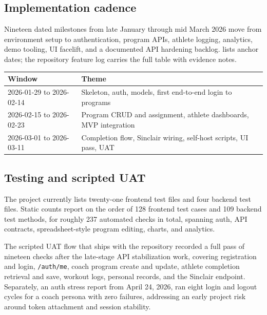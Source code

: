 \documentclass[
  letterpaper,
  DIV=11,
  numbers=noendperiod]{scrartcl}
\begin{document}
\subsection{Implementation cadence}\label{implementation-cadence}

Nineteen dated milestones from late January through mid March 2026 move
from environment setup to authentication, program APIs, athlete logging,
analytics, demo tooling, UI facelift, and a documented API hardening
backlog.  lists anchor dates; the repository
feature log carries the full table with evidence notes.

\begin{strip}
\noindent\begin{minipage}{\textwidth}
\centering
\small
\begin{tabular}{ll}
\toprule
\textbf{Window} & \textbf{Theme} \\
\midrule
2026-01-29 to 2026-02-14 & Skeleton, auth, models, first end-to-end login to programs \\
2026-02-15 to 2026-02-23 & Program CRUD and assignment, athlete dashboards, MVP integration \\
2026-03-01 to 2026-03-11 & Completion flow, Sinclair wiring, self-host scripts, UI pass, UAT \\
\bottomrule
\end{tabular}
\label{tbl-milestones}
\end{minipage}
\end{strip}
\FloatBarrier

\subsection{Testing and scripted UAT}\label{testing-and-scripted-uat}

The project currently lists twenty-one frontend test files and four
backend test files. Static counts report on the order of 128 frontend
test cases and 109 backend test methods, for roughly 237 automated
checks in total, spanning auth, API contracts, spreadsheet-style program
editing, charts, and analytics.

The scripted UAT flow that ships with the repository recorded a full
pass of nineteen checks after the late-stage API stabilization work,
covering registration and login, \texttt{/auth/me}, coach program create
and update, athlete completion retrieval and save, workout logs,
personal records, and the Sinclair endpoint. Separately, an auth stress
report from April 24, 2026, ran eight login and logout cycles for a
coach persona with zero failures, addressing an early project risk
around token attachment and session stability.
\end{document}
